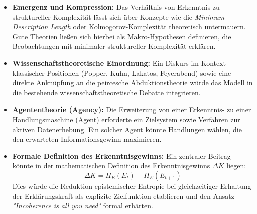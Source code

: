 \documentclass[11pt, a4paper]{article}
\begin{document}
\begin{itemize}
	\item \textbf{Emergenz und Kompression:} Das Verhältnis von Erkenntnis zu struktureller Komplexität lässt sich über Konzepte wie die \textit{Minimum Description Length} oder Kolmogorov-Komplexität theoretisch untermauern. Gute Theorien ließen sich hierbei als Makro-Hypothesen definieren, die Beobachtungen mit minimaler struktureller Komplexität erklären.
	
	\item \textbf{Wissenschaftstheoretische Einordnung:} Ein Diskurs im Kontext klassischer Positionen (Popper, Kuhn, Lakatos, Feyerabend) sowie eine direkte Anknüpfung an die peircesche Abduktionstheorie würde das Modell in die bestehende wissenschaftstheoretische Debatte integrieren.
	
	\item \textbf{Agententheorie (Agency):} Die Erweiterung von einer Erkenntnis- zu einer Handlungsmaschine (Agent) erforderte ein Zielsystem sowie Verfahren zur aktiven Datenerhebung. Ein solcher Agent könnte Handlungen wählen, die den erwarteten Informationsgewinn maximieren.
	
	\item \textbf{Formale Definition des Erkenntnisgewinns:} Ein zentraler Beitrag könnte in der mathematischen Definition des Erkenntnisgewinns $\Delta K$ liegen:
	\begin{equation}
		\Delta K = H_E(E_t) - H_E(E_{t+1})
	\end{equation}
	Dies würde die Reduktion epistemischer Entropie bei gleichzeitiger Erhaltung der Erklärungskraft als explizite Zielfunktion etablieren und den Ansatz \textit{"Incoherence is all you need"} formal erhärten.
\end{itemize}
\newpage
\end{document}
